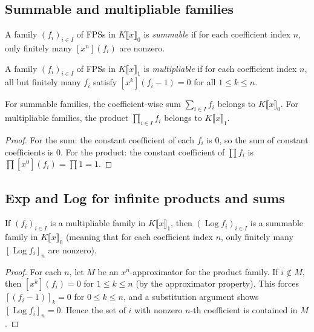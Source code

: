 \subsection{Summable and multipliable families}

\begin{definition}
\label{def.fps.summable-multipliable}
\leanhelper
\leanok
A family $(f_i)_{i \in I}$ of FPSs in $K\llbracket x \rrbracket_0$
is \emph{summable} if for each coefficient index $n$, only finitely many
$[x^n](f_i)$ are nonzero.

A family $(f_i)_{i \in I}$ of FPSs in $K\llbracket x \rrbracket_1$
is \emph{multipliable} if for each coefficient index $n$, all but finitely many
$f_i$ satisfy $[x^k](f_i - 1) = 0$ for all $1 \le k \le n$.

For summable families, the coefficient-wise sum $\sum_{i \in I} f_i$
belongs to $K\llbracket x \rrbracket_0$.
For multipliable families, the product $\prod_{i \in I} f_i$
belongs to $K\llbracket x \rrbracket_1$.
\end{definition}

\begin{proof}
For the sum: the constant coefficient of each $f_i$ is $0$, so the sum
of constant coefficients is $0$.
For the product: the constant coefficient of $\prod f_i$ is $\prod [x^0](f_i) = \prod 1 = 1$.
\end{proof}

\subsection{Exp and Log for infinite products and sums}

\begin{lemma}
\label{lem.fps.Log-summable}
\leanhelper
\leanok
If $(f_i)_{i \in I}$ is a multipliable family in
$K\llbracket x \rrbracket_1$, then $(\operatorname{Log} f_i)_{i \in I}$
is a summable family in $K\llbracket x \rrbracket_0$
(meaning that for each coefficient index $n$, only finitely many
$[\operatorname{Log} f_i]_n$ are nonzero).
\end{lemma}

\begin{proof}
For each $n$, let $M$ be an $x^n$-approximator for the product family.
If $i \notin M$, then $[x^k](f_i) = 0$ for $1 \le k \le n$
(by the approximator property).
This forces $[(f_i - 1)]_k = 0$ for $0 \le k \le n$,
and a substitution argument shows $[\operatorname{Log} f_i]_n = 0$.
Hence the set of $i$ with nonzero $n$-th coefficient is contained in $M$.
\end{proof}

